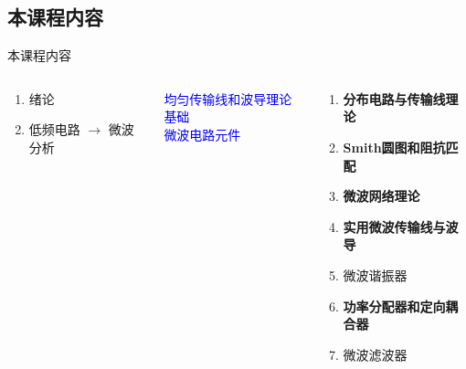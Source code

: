 \subsection{本课程内容}
\begin{frame}{本课程内容}
  \begin{columns}
    \begin{column}{0.2\linewidth}
      \begin{enumerate}
        \item 绪论
        \item 低频电路 $\longrightarrow$ 微波分析
              \saveenum
      \end{enumerate}
    \end{column}
    \begin{column}{0.3\linewidth}
      \textcolor{blue}{均匀传输线和波导理论基础}\\
      \textcolor{blue}{微波电路元件}
    \end{column}
    \begin{column}{0.5\linewidth}
      \begin{enumerate}
        \resume
        \item \textbf{分布电路与传输线理论}
        \item \textbf{Smith圆图和阻抗匹配}
        \item \textbf{微波网络理论}
        \item \textbf{实用微波传输线与波导}
        \item 微波谐振器
        \item \textbf{功率分配器和定向耦合器}
        \item 微波滤波器
      \end{enumerate}
    \end{column}
  \end{columns}
\end{frame}

